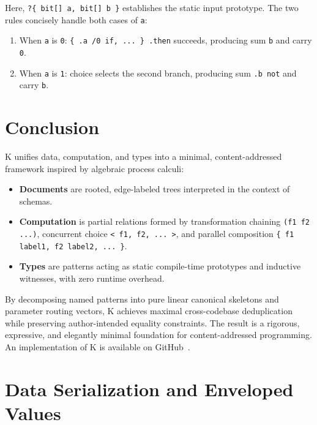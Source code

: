 \documentclass[11pt,a4paper]{article}
\begin{document}
Here, \lstinline|?{ bit[] a, bit[] b }| establishes the static input prototype. The two rules concisely handle both cases of \lstinline|a|:
\begin{enumerate}
  \item When \lstinline|a| is \lstinline|0|: \lstinline|{ .a /0 if, ... } .then| succeeds, producing sum \lstinline|b| and carry \lstinline|0|.
  \item When \lstinline|a| is \lstinline|1|: choice selects the second branch, producing sum \lstinline|.b not| and carry \lstinline|b|.
\end{enumerate}

\section{Conclusion}

K unifies data, computation, and types into a minimal, content-addressed framework inspired by algebraic process calculi:
\begin{itemize}
  \item \textbf{Documents} are rooted, edge-labeled trees interpreted in the context of schemas.
  \item \textbf{Computation} is partial relations formed by transformation chaining \lstinline|(f1 f2 ...)|, concurrent choice \lstinline|< f1, f2, ... >|, and parallel composition \lstinline|{ f1 label1, f2 label2, ... }|.
  \item \textbf{Types} are patterns acting as static compile-time prototypes and inductive witnesses, with zero runtime overhead.
\end{itemize}

By decomposing named patterns into pure linear canonical skeletons and parameter routing vectors, K achieves maximal cross-codebase deduplication while preserving author-intended equality constraints. The result is a rigorous, expressive, and elegantly minimal foundation for content-addressed programming. An implementation of K is available on GitHub~\cite{k2026github}.

\appendix
\section{Data Serialization and Enveloped Values}
\end{document}
